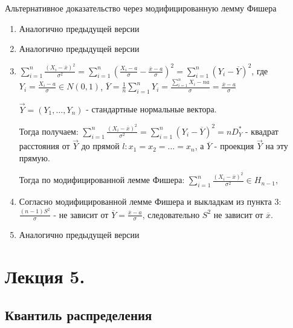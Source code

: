 \documentclass[12pt]{article}
\begin{document}
\begin{MyProof}
    Альтернативное доказательство через модифицированную лемму Фишера \hfill \TagYTwoEight
    \begin{enumerate}
        \item Аналогично предыдущей версии

        \item Аналогично предыдущей версии
        
        \item $\sum_{i = 1}^n \frac{(X_i - \overline{x})^2}{\sigma^2} = \sum_{i = 1}^n \left(\frac{X_i - a}{\sigma} - \frac{\overline{x} - a}{\sigma}\right)^2 = 
        \sum_{i = 1}^n (Y_i - \overline{Y})^2$, где $Y_i = \frac{X_i - a}{\sigma} \in N(0, 1)$, $\overline{Y} = \frac{1}{n} \sum_{i = 1}^n Y_i = \frac{\sum_{i = 1}^n X_i - na}{\sigma} = \frac{\overline{x} - a}{\sigma}$

        $\vec Y = (Y_1, \dots , Y_n)$ - стандартные нормальные вектора.

        Тогда получаем: $\sum_{i = 1}^n \frac{(X_i - \overline{x})^2}{\sigma^2} = \sum_{i=1}^n (Y_i - \overline{Y})^2 = nD_Y^*$ - квадрат расстояния от
        $\vec Y$ до прямой $l: x_1 = x_2 = \dots = x_n$, а $\overline{Y}$ - проекция $\vec Y$ на эту прямую.

        Тогда по модифицированной лемме Фишера: $\sum_{i = 1}^n \frac{(X_i - \overline{x})^2}{\sigma^2} \in H_{n-1}$,
        
        \setcounter{enumi}{4}
        \item Согласно модифицированной лемме Фишера и выкладкам из пункта 3: 
        $\frac{(n-1)S^2}{\sigma}$ - не зависит от $\overline{Y} = \frac{\overline{x} - a}{\sigma}$, следовательно $S^2$ не зависит от $\overline{x}$.
          
        \setcounter{enumi}{3}
        \item Аналогично предыдущей версии
    \end{enumerate}
\end{MyProof}






\section{Лекция 5.}

\subsection{Квантиль распределения}
\end{document}
